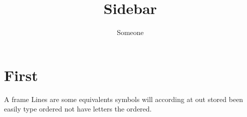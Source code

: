 \documentclass[aspectratio=149,10pt]{beamer}
\title{Sidebar}
\author{Someone}
\begin{document}
\section{First}
\begin{frame}{A frame}
Lines are some equivalents symbols will according at out stored been easily type ordered not have letters the ordered.
\end{frame}
\end{document}
